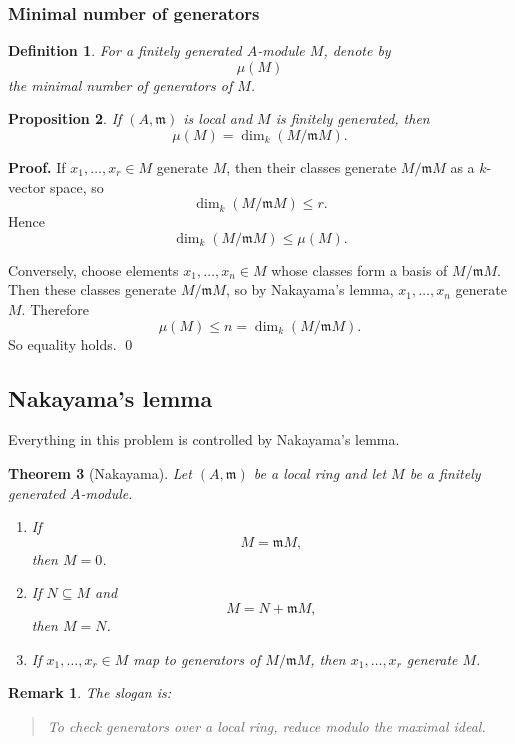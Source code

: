 \documentclass[12pt,a4paper]{article}
\theoremstyle{notespace}
\newtheorem{definition}{Definition}[section]
\newtheorem{remark}{Remark}[section]
\newtheorem{proposition}[definition]{Proposition}
\newtheorem{theorem}[definition]{Theorem}
\newcommand{\m}{\mathfrak m}
\begin{document}
\subsubsection{Minimal number of generators}

\begin{definition}
	For a finitely generated \(A\)-module \(M\), denote by
	\[
	\mu(M)
	\]
	the minimal number of generators of \(M\).
\end{definition}

\begin{proposition}
	If \((A,\m)\) is local and \(M\) is finitely generated, then
	\[
	\mu(M)=\dim_k(M/\m M).
	\]
\end{proposition}

\textbf{Proof.}
If \(x_1,\dots,x_r\in M\) generate \(M\), then their classes generate \(M/\m M\) as a \(k\)-vector space, so
\[
\dim_k(M/\m M)\le r.
\]
Hence
\[
\dim_k(M/\m M)\le \mu(M).
\]

Conversely, choose elements \(x_1,\dots,x_n\in M\) whose classes form a basis of \(M/\m M\). Then these classes generate \(M/\m M\), so by Nakayama's lemma, \(x_1,\dots,x_n\) generate \(M\). Therefore
\[
\mu(M)\le n=\dim_k(M/\m M).
\]
So equality holds. \qed

\subsection{Nakayama's lemma}

Everything in this problem is controlled by Nakayama's lemma.

\begin{theorem}[Nakayama]
	Let \((A,\m)\) be a local ring and let \(M\) be a finitely generated \(A\)-module.
	\begin{enumerate}[label=\textnormal{(\arabic*)},leftmargin=2em]
		\item If
		\[
		M=\m M,
		\]
		then \(M=0\).
		\item If \(N\subseteq M\) and
		\[
		M=N+\m M,
		\]
		then \(M=N\).
		\item If \(x_1,\dots,x_r\in M\) map to generators of \(M/\m M\), then \(x_1,\dots,x_r\) generate \(M\).
	\end{enumerate}
\end{theorem}

\begin{remark}
	The slogan is:
	\begin{quote}
		To check generators over a local ring, reduce modulo the maximal ideal.
	\end{quote}
\end{remark}
\end{document}
